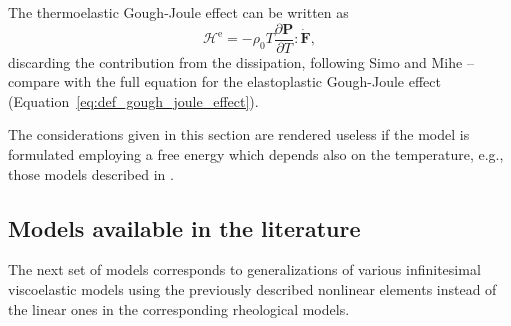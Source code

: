 The thermoelastic Gough-Joule effect can be written as
\begin{equation}
	\mathcal H^\text{e} = -\rho_0T\frac{\partial \mathbf P}{\partial T}:\dot{\mathbf F},
\end{equation}
discarding the contribution from the dissipation, following Simo and Mihe \citep{simoAssociativeCoupledThermoplasticity1992}--compare with the full equation for the elastoplastic Gough-Joule effect (Equation~\eqref{eq:def_gough_joule_effect}).

The considerations given in this section are rendered useless if the model is formulated employing a free energy which depends also on the temperature, e.g., those models described in  \citep{anandThermomechanicallyCoupledTheory2009, amesThermomechanicallyCoupledTheory2009}.

\subsection{Models available in the literature}
\label{sec:rheo_models}


The next set of models corresponds to generalizations of various infinitesimal viscoelastic models using the previously described nonlinear elements instead of the linear ones in the corresponding rheological models.

